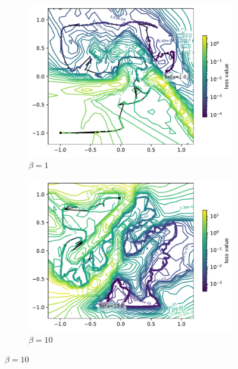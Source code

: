 \documentclass[letterpaper]{article} %
\begin{document}
        \begin{figure}[htb]
            \centering
            
            \begin{subfigure}[b]{0.3\textwidth}
                \centering
                \includegraphics[width=\textwidth]{figures/round3/Fails/beta_/b1.pdf}
                \caption{$\beta=1$}
            \end{subfigure}
            \hfill
            \begin{subfigure}[b]{0.3\textwidth}
                \centering
                \includegraphics[width=\textwidth]{figures/round3/Fails/beta_/b10.pdf}
                \caption{$\beta=10$}
            \end{subfigure}

\end{figure}
\end{document}
